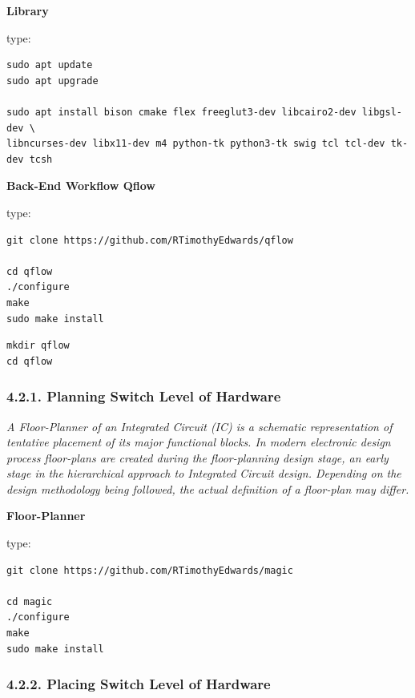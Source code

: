 \documentclass[
]{article}
\begin{document}
\textbf{Library}

type:

\begin{verbatim}
sudo apt update
sudo apt upgrade

sudo apt install bison cmake flex freeglut3-dev libcairo2-dev libgsl-dev \
libncurses-dev libx11-dev m4 python-tk python3-tk swig tcl tcl-dev tk-dev tcsh
\end{verbatim}

\textbf{Back-End Workflow Qflow}

type:

\begin{verbatim}
git clone https://github.com/RTimothyEdwards/qflow

cd qflow
./configure
make
sudo make install
\end{verbatim}

\begin{verbatim}
mkdir qflow
cd qflow
\end{verbatim}

\hypertarget{planning-switch-level-of-hardware}{%
\subsubsection{4.2.1. Planning Switch Level of
Hardware}\label{planning-switch-level-of-hardware}}

\emph{A Floor-Planner of an Integrated Circuit (IC) is a schematic
representation of tentative placement of its major functional blocks. In
modern electronic design process floor-plans are created during the
floor-planning design stage, an early stage in the hierarchical approach
to Integrated Circuit design. Depending on the design methodology being
followed, the actual definition of a floor-plan may differ.}

\textbf{Floor-Planner}

type:

\begin{verbatim}
git clone https://github.com/RTimothyEdwards/magic

cd magic
./configure
make
sudo make install
\end{verbatim}

\hypertarget{placing-switch-level-of-hardware}{%
\subsubsection{4.2.2. Placing Switch Level of
Hardware}\label{placing-switch-level-of-hardware}}
\end{document}
